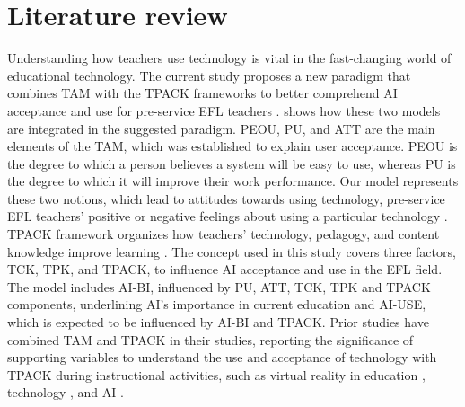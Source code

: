\documentclass[english]{textolivre}
\begin{document}
\section{Literature review}\label{sec-normas}
Understanding how teachers use technology is vital in the fast-changing world of educational technology. The current study proposes a new paradigm that combines TAM with the TPACK frameworks to better comprehend AI acceptance and use for pre-service EFL teachers \cite{aladwan2024useintention,habibi2023mlms}.  shows how these two models are integrated in the suggested paradigm. PEOU, PU, and ATT are the main elements of the TAM, which was established to explain user acceptance. PEOU is the degree to which a person believes a system will be easy to use, whereas PU is the degree to which it will improve their work performance. Our model represents these two notions, which lead to attitudes towards using technology, pre-service EFL teachers’ positive or negative feelings about using a particular technology \cite{davis1989tam}. TPACK framework organizes how teachers’ technology, pedagogy, and content knowledge improve learning \cite{mishra2009tpack}. The concept used in this study covers three factors, TCK, TPK, and TPACK, to influence AI acceptance and use in the EFL field. The model includes AI-BI, influenced by PU, ATT, TCK, TPK and TPACK components, underlining AI’s importance in current education and AI-USE, which is expected to be influenced by AI-BI and TPACK. Prior studies have combined TAM and TPACK in their studies, reporting the significance of supporting variables to understand the use and acceptance of technology with TPACK during instructional activities, such as virtual reality in education \cite{thohir2023vr}, technology \cite{cheng2024tpack}, and AI \cite{sun2024ai}.
\end{document}
